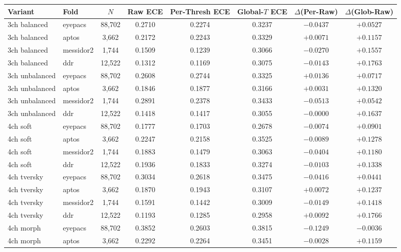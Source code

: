 \documentclass[11pt]{article}
\begin{document}
\begin{table}[ht]
\centering
\small
\begin{tabular}{llcccccc}
\toprule
Variant & Fold & $N$ & Raw ECE & Per-Thresh ECE & Global-$T$ ECE & $\Delta$(Per-Raw) & $\Delta$(Glob-Raw) \\
\midrule
3ch balanced   & eyepacs   & 88{,}702 & 0.2710 & 0.2274 & 0.3237 & $-0.0437$ & $+0.0527$ \\
3ch balanced   & aptos     &  3{,}662 & 0.2172 & 0.2243 & 0.3329 & $+0.0071$ & $+0.1157$ \\
3ch balanced   & messidor2 &  1{,}744 & 0.1509 & 0.1239 & 0.3066 & $-0.0270$ & $+0.1557$ \\
3ch balanced   & ddr       & 12{,}522 & 0.1312 & 0.1169 & 0.3075 & $-0.0143$ & $+0.1763$ \\
3ch unbalanced & eyepacs   & 88{,}702 & 0.2608 & 0.2744 & 0.3325 & $+0.0136$ & $+0.0717$ \\
3ch unbalanced & aptos     &  3{,}662 & 0.1846 & 0.1877 & 0.3166 & $+0.0031$ & $+0.1320$ \\
3ch unbalanced & messidor2 &  1{,}744 & 0.2891 & 0.2378 & 0.3433 & $-0.0513$ & $+0.0542$ \\
3ch unbalanced & ddr       & 12{,}522 & 0.1418 & 0.1417 & 0.3055 & $-0.0000$ & $+0.1637$ \\
4ch soft       & eyepacs   & 88{,}702 & 0.1777 & 0.1703 & 0.2678 & $-0.0074$ & $+0.0901$ \\
4ch soft       & aptos     &  3{,}662 & 0.2247 & 0.2158 & 0.3525 & $-0.0089$ & $+0.1278$ \\
4ch soft       & messidor2 &  1{,}744 & 0.1883 & 0.1479 & 0.3063 & $-0.0404$ & $+0.1180$ \\
4ch soft       & ddr       & 12{,}522 & 0.1936 & 0.1833 & 0.3274 & $-0.0103$ & $+0.1338$ \\
4ch tversky    & eyepacs   & 88{,}702 & 0.3034 & 0.2618 & 0.3475 & $-0.0416$ & $+0.0441$ \\
4ch tversky    & aptos     &  3{,}662 & 0.1870 & 0.1943 & 0.3107 & $+0.0072$ & $+0.1237$ \\
4ch tversky    & messidor2 &  1{,}744 & 0.1591 & 0.1442 & 0.3009 & $-0.0149$ & $+0.1418$ \\
4ch tversky    & ddr       & 12{,}522 & 0.1193 & 0.1285 & 0.2958 & $+0.0092$ & $+0.1766$ \\
4ch morph      & eyepacs   & 88{,}702 & 0.3852 & 0.2603 & 0.3815 & $-0.1249$ & $-0.0036$ \\
4ch morph      & aptos     &  3{,}662 & 0.2292 & 0.2264 & 0.3451 & $-0.0028$ & $+0.1159$ \\

\end{tabular}
\end{table}
\end{document}
